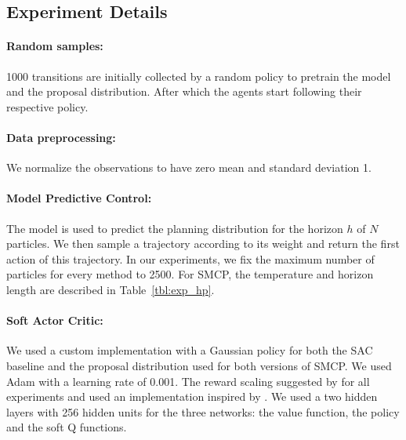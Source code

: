 
\subsection{Experiment Details}
\label{app:exp_details}

\paragraph{Random samples:} 1000 transitions are initially collected by a random policy to pretrain the model and the proposal distribution. After which the agents start following their respective policy.

\paragraph{Data preprocessing:} We normalize the observations to have zero mean and standard deviation 1. 

\paragraph{Model Predictive Control:} The model is used to predict the planning distribution for the horizon $h$ of $N$ particles. We then sample a trajectory according to its weight and return the first action of this trajectory. In our experiments, we fix the maximum number of particles for every method to 2500. For SMCP, the temperature and horizon length are described in Table~\ref{tbl:exp_hp}.

\paragraph{Soft Actor Critic:} We used a custom implementation with a Gaussian policy for both the SAC baseline and the proposal distribution used for both versions of SMCP. We used Adam \citep{kingma2014adam} with a learning rate of 0.001. The reward scaling suggested by \citet{haarnoja2018soft} for all experiments and used an implementation inspired by \citet{pong2018}. We used a two hidden layers with 256 hidden units for the three networks: the value function, the policy and the soft Q functions.

